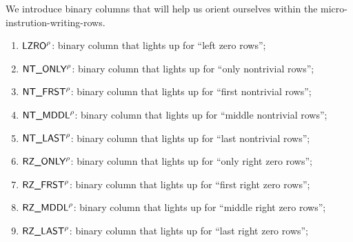 We introduce binary columns that will help us orient ourselves within the micro-instrution-writing-rows.
\begin{enumerate}[resume]
	\item $\textsf{LZRO}^\rho$:
		binary column that lights up for ``left zero rows''; 
	\item $\textsf{NT\_ONLY}^\rho$:
		binary column that lights up for ``only nontrivial rows''; 
	\item $\textsf{NT\_FRST}^\rho$:
		binary column that lights up for ``first nontrivial rows''; 
	\item $\textsf{NT\_MDDL}^\rho$:
		binary column that lights up for ``middle nontrivial rows''; 
	\item $\textsf{NT\_LAST}^\rho$:
		binary column that lights up for ``last nontrivial rows''; 
	\item $\textsf{RZ\_ONLY}^\rho$:
		binary column that lights up for ``only right zero rows''; 
	\item $\textsf{RZ\_FRST}^\rho$:
		binary column that lights up for ``first right zero rows''; 
	\item $\textsf{RZ\_MDDL}^\rho$:
		binary column that lights up for ``middle right zero rows''; 
	\item $\textsf{RZ\_LAST}^\rho$:
		binary column that lights up for ``last right zero rows''; 
\end{enumerate}
